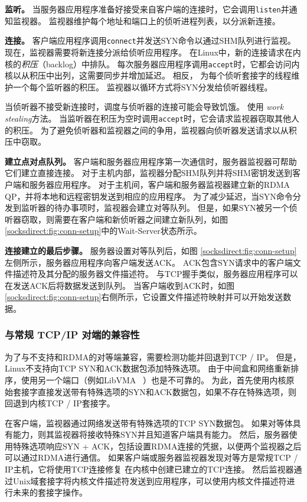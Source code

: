 \textbf{监听。}
当服务器应用程序准备好接受来自客户端的连接时，它会调用\texttt {listen}并通知监视器。
监视器维护每个地址和端口上的侦听进程列表，以分派新连接。


\textbf{连接。}
客户端应用程序调用\texttt {connect}并发送SYN命令以通过SHM队列进行监视。
现在，监视器需要将新连接分派给侦听应用程序。
在Linux中，新的连接请求在内核的\emph {积压}（backlog）中排队。
每次服务器应用程序调用\texttt {accept}时，它都会访问内核以从积压中出列，这需要同步并增加延迟。
相反，\sys{} 为每个侦听套接字的线程维护一个每个监听器的积压。
监视器以循环方式将SYN分发给侦听器线程。

当侦听器不接受新连接时，调度与侦听器的连接可能会导致饥饿。
\sys{} 使用 \emph {work stealing}方法。
当监听器在积压为空时调用\texttt {accept}时，它会请求监视器窃取其他人的积压。
为了避免侦听器和监视器之间的争用，监视器向侦听器发送请求以从积压中窃取。

\textbf {建立点对点队列。}
客户端和服务器应用程序第一次通信时，服务器监视器可帮助它们建立直接连接。
对于主机内部，监视器分配SHM队列并将SHM密钥发送到客户端和服务器应用程序。
对于主机间，客户端和服务器监视器建立新的RDMA QP，并将本地和远程密钥发送到相应的应用程序。
为了减少延迟，当SYN命令分发到监听器的待办事项时，监视器会建立对等队列。
但是，如果SYN被另一个侦听器窃取，则需要在客户端和新侦听器之间建立新队列，如图 \ref {socksdirect:fig:conn-setup}中的Wait-Server状态所示。

\textbf {连接建立的最后步骤。}
服务器设置对等队列后，如图 \ref {socksdirect:fig:conn-setup}左侧所示，服务器应用程序向客户端发送ACK。 ACK包含SYN请求中的客户端文件描述符及其分配的服务器文件描述符。
与TCP握手类似，服务器应用程序可以在发送ACK后将数据发送到队列。
当客户端收到ACK时，如图 \ref {socksdirect:fig:conn-setup}右侧所示，它设置文件描述符映射并可以开始发送数据。


\subsubsection{与常规 TCP/IP 对端的兼容性}


为了与不支持\sys {}和RDMA的对等端兼容，需要检测\sys {}功能并回退到TCP / IP。
但是，Linux不支持向TCP SYN和ACK数据包添加特殊选项。
由于中间盒和网络重新排序，使用另一个端口（例如LibVMA~ \cite {libvma}）也是不可靠的。
为此，首先使用内核原始套接字直接发送带有特殊选项的SYN和ACK数据包，如果不存在特殊选项，则回退到内核TCP / IP套接字。

在客户端，监视器通过网络发送带有特殊选项的TCP SYN数据包。
如果对等体具有\sys {}能力，则其监视器将接收特殊SYN并且知道客户端具有\sys {}能力。
然后，服务器使用特殊选项响应SYN + ACK，包括设置RDMA连接的凭据，以便两个监视器之后可以通过RDMA进行通信。
如果客户端或服务器监视器发现对等方是常规TCP / IP主机，它将使用TCP连接修复 \cite {tcp-connection-repair}在内核中创建已建立的TCP连接。
然后监视器通过Unix域套接字将内核文件描述符发送到应用程序，\libipc {}可以使用内核文件描述符进行未来的套接字操作。


